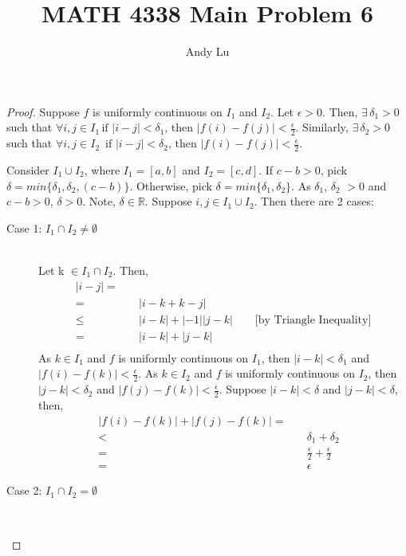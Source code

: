 \documentclass{article}
\title{MATH 4338 Main Problem 6}
\date{}
\author{Andy Lu}
\begin{document}
  \maketitle
  \begin{proof} 
    Suppose $f$ is uniformly continuous on $I_1$ and $I_2$. Let $\epsilon >0$.
    Then,  $\exists \, \delta_1 > 0$ such that $\forall i,j \in I_1 \, \text{
     if } |i-j| < \delta_1 \text{, then } |f(i)-f(j)| < \frac{\epsilon}{2}$. 
    Similarly, $\exists \, \delta_2 > 0$ such that $\forall i,j \in I_2 \, 
    \text{ if } |i-j| < \delta_2 \text{, then } |f(i)-f(j)| < 
    \frac{\epsilon}{2}$.
    
    Consider $I_1 \cup I_2$, where $I_1 = [a,b]$ and $I_2 = [c,d]$. If 
    $c - b > 0$, pick $\delta = min\{\delta_1, \delta_2, (c-b)\}$. 
    Otherwise, pick $\delta = min\{\delta_1, \delta_2\}$. As 
    $\delta_1$, $\delta_2$ $> 0$ and $c-b > 0$, $\delta > 0$. Note, $\delta \in
    \mathbb{R}$. Suppose $i,j \in I_1 \cup I_2$. Then there are 2 cases:
    \begin{description}
      \item[Case 1: $I_1 \cap I_2 \neq \emptyset$] \hfill \\
        Let k $\in I_1 \cap I_2$. Then,
        \begin{align*}
          |i-j| =& \\
          =& \quad |i-k + k-j| \\
          \leq& \quad |i-k|+|-1||j-k| \qquad \text{[by Triangle Inequality]} \\
          =& \quad |i-k| + |j-k| \\
        \end{align*}
        As $k \in I_1$ and $f$ is uniformly continuous on $I_1$, then 
        $|i-k| < \delta_1$ and $|f(i) - f(k)| < \frac{\epsilon}{2}$. 
        As $k \in I_2$ and $f$ is uniformly continuous on $I_2$, then 
        $|j-k| < \delta_2$ and $|f(j) - f(k)| < \frac{\epsilon}{2}$. 
        Suppose $|i-k| < \delta$ and $|j-k| < \delta$, then,
        \begin{align*}
          |f(i) - f(k)| + |f(j) - f(k)| =& &\\
          <& \quad \delta_1 + \delta_2 &\\
          =& \quad \frac{\epsilon}{2} + \frac{\epsilon}{2} &\\
          =& \quad \epsilon &
        \end{align*}
      \item[Case 2: $I_1 \cap I_2 = \emptyset$]  \hfill \\

\end{description}
\end{proof}
\end{document}
